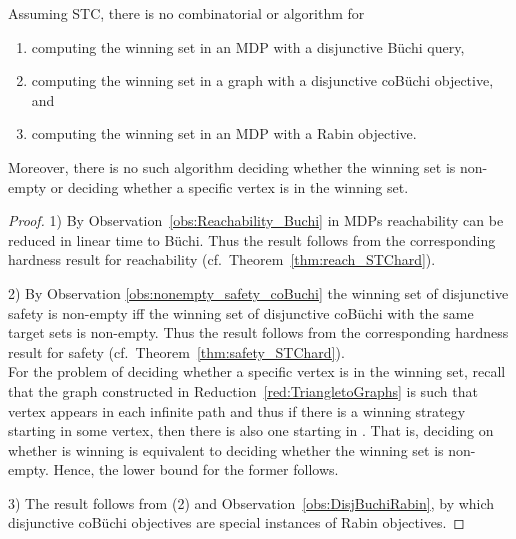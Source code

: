 \documentclass[11pt,letterpaper]{article}
\begin{document}
\begin{proposition}
  Assuming STC, there is no combinatorial  or  algorithm for 
  \begin{enumerate}
   \item computing the winning set in an MDP with a disjunctive Büchi query,
   \item computing the winning set in a graph with a disjunctive coBüchi objective, and
   \item computing the winning set in an MDP with a Rabin objective.
  \end{enumerate}
  Moreover, there is no such algorithm deciding whether the winning set is non-empty
  or deciding whether a specific vertex is in the winning set.
\end{proposition}
\begin{proof}
 1) By Observation~\ref{obs:Reachability_Buchi} in MDPs reachability can be reduced in
 linear time to Büchi. Thus the result follows from
    the corresponding hardness result for reachability (cf.\ Theorem~\ref{thm:reach_STChard}).
    
 2) By Observation \ref{obs:nonempty_safety_coBuchi} the winning set of disjunctive safety is non-empty iff
    the winning set of disjunctive coBüchi with the same target sets is non-empty. Thus 
    the result follows from the corresponding hardness result for safety (cf.\ Theorem~\ref{thm:safety_STChard}).\\
    For the problem of deciding whether a specific vertex is in the winning set, recall
    that the graph  constructed in Reduction~\ref{red:TriangletoGraphs} is such that vertex 
    appears in each infinite path and thus if there is a winning strategy starting in some vertex,
    then there is also one starting in . 
    That is, deciding on  whether  is winning is equivalent to deciding whether the winning
    set is non-empty. Hence, the lower bound for the former follows.    
    
 3) The result follows from (2) and Observation~\ref{obs:DisjBuchiRabin}, by which disjunctive coBüchi objectives are special instances of Rabin objectives.
\end{proof}
\end{document}
